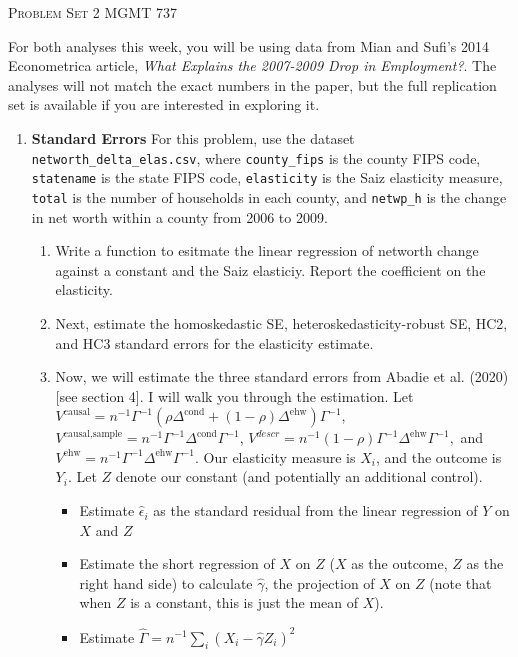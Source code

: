 \documentclass[11pt, a4paper]{article}
\begin{document}
\begin{center}
  {\Large \textsc{Problem Set 2}}
  MGMT 737
\end{center}

For both analyses this week, you will be using data from Mian and
Sufi's 2014 Econometrica article, \textit{What Explains the 2007-2009
  Drop in Employment?}. The analyses will not match the exact
numbers in the paper, but the full replication set is available if you are interested in exploring it.

\begin{enumerate}
\item \textbf{Standard Errors} For this problem, use the dataset \texttt{networth\_delta\_elas.csv}, where \texttt{county\_fips} is the county FIPS code, \texttt{statename} is the state FIPS code, \texttt{elasticity} is the Saiz elasticity measure, \texttt{total} is the number of households in each county, and \texttt{netwp\_h} is the change in net worth within a county from 2006 to 2009.
  \begin{enumerate}
  \item Write a function to esitmate the linear regression of networth change against a constant and the Saiz elasticiy. Report the coefficient on the elasticity. 
  \item Next, estimate the homoskedastic SE, heteroskedasticity-robust SE, HC2, and HC3 standard errors for the elasticity estimate.
  \item Now, we will estimate the three standard errors from Abadie et al. (2020) [see section 4]. I will walk you through the estimation. Let $V^{\text{causal}} = n^{-1}\Gamma^{-1}(\rho\Delta^{\text{cond}} + (1-\rho)\Delta^{\text{ehw}})\Gamma^{-1}$, $V^{\text{causal,sample}} = n^{-1}\Gamma^{-1}\Delta^{\text{cond}}\Gamma^{-1}$, $V^{descr} = n^{-1}(1-\rho)\Gamma^{-1}\Delta^{\text{ehw}}\Gamma^{-1},$ and $V^{\text{ehw}} = n^{-1}\Gamma^{-1}\Delta^{\text{ehw}}\Gamma^{-1}.$ Our elasticity measure is $X_{i}$, and the outcome is $Y_{i}$. Let $Z$ denote our constant (and potentially an additional control).
    \begin{itemize}
    \item Estimate $\hat{\epsilon}_{i}$ as the standard residual from
      the linear regression of $Y$ on $X$ and $Z$
    \item Estimate the short regression of $X$ on $Z$ ($X$ as the outcome, $Z$ as the right hand side)  to calculate $\hat{\gamma}$, the projection of $X$ on $Z$ (note that when $Z$ is a constant, this is just the mean of $X$).
    \item Estimate $\hat{\Gamma} = n^{-1}\sum_{i}(X_{i} - \hat{\gamma}Z_{i})^{2}$

\end{itemize}
\end{enumerate}
\end{enumerate}
\end{document}
